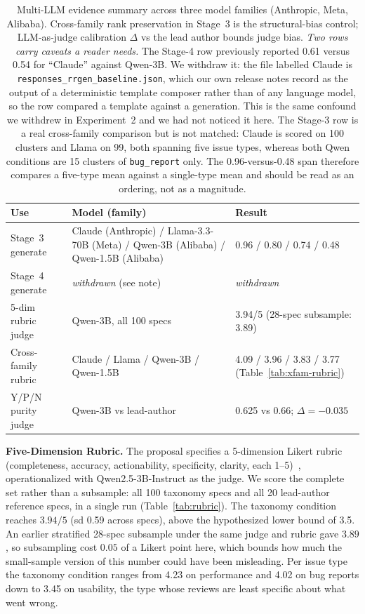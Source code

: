\documentclass[preprint,12pt]{elsarticle}
\begin{document}
\begin{table}[!htbp]\centering\footnotesize
\caption{Multi-LLM evidence summary across three model families (Anthropic, Meta, Alibaba).
Cross-family rank preservation in Stage~3 is the structural-bias control; LLM-as-judge
calibration $\Delta$ vs the lead author bounds judge bias. \emph{Two rows carry caveats a reader
needs.} The Stage-4 row previously reported 0.61 versus 0.54 for ``Claude'' against Qwen-3B. We
withdraw it: the file labelled Claude is \texttt{responses\_rrgen\_baseline.json}, which our own
release notes record as the output of a deterministic template composer rather than of any
language model, so the row compared a template against a generation. This is the same confound we
withdrew in Experiment~2 and we had not noticed it here. The Stage-3 row is a real cross-family
comparison but is not matched: Claude is scored on 100 clusters and Llama on 99, both spanning
five issue types, whereas both Qwen conditions are 15 clusters of \texttt{bug\_report} only. The
0.96-versus-0.48 span therefore compares a five-type mean against a single-type mean and should be
read as an ordering, not as a magnitude.}\label{tab:multi-llm}
\begin{tabular}{@{}p{2.7cm}p{2.9cm}p{2.4cm}@{}}\toprule
Use & Model (family) & Result \\\midrule
Stage~3 generate & Claude (Anthropic) / Llama-3.3-70B (Meta) / Qwen-3B (Alibaba) / Qwen-1.5B (Alibaba) & 0.96 / 0.80 / 0.74 / 0.48 \\
Stage~4 generate & \emph{withdrawn} (see note) & \emph{withdrawn} \\
5-dim rubric judge & Qwen-3B, all 100 specs & 3.94/5 (28-spec subsample: 3.89) \\
Cross-family rubric & Claude / Llama / Qwen-3B / Qwen-1.5B & 4.09 / 3.96 / 3.83 / 3.77 (Table~\ref{tab:xfam-rubric}) \\
Y/P/N purity judge & Qwen-3B vs lead-author & 0.625 vs 0.66; $\Delta=-0.035$ \\
\bottomrule\end{tabular}\end{table}

\textbf{Five-Dimension Rubric.} The proposal specifies a 5-dimension Likert rubric
(completeness, accuracy, actionability, specificity, clarity, each 1--5)~\cite{gilardi2023chatgpt,
pangakis2023automated, zheng2023judging}, operationalized with Qwen2.5-3B-Instruct as the judge.
We score the complete set rather than a subsample: all 100 taxonomy specs and all 20 lead-author
reference specs, in a single run (Table~\ref{tab:rubric}). The taxonomy condition reaches
$3.94/5$ (sd 0.59 across specs), above the hypothesized lower bound of 3.5. An earlier stratified
28-spec subsample under the same judge and rubric gave $3.89$, so subsampling cost $0.05$ of a
Likert point here, which bounds how much the small-sample version of this number could have been
misleading. Per issue type the taxonomy condition ranges from 4.23 on performance and 4.02 on
bug reports down to 3.45 on usability, the type whose reviews are least specific about what
went wrong.
\end{document}
